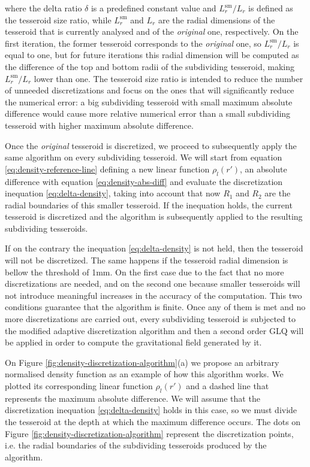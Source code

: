 \documentclass[extra]{gji}
\begin{document}
\noindent where the delta ratio $\delta$ is a predefined constant value and
$L_r^\text{sm}/L_r$ is defined as the tesseroid size ratio, while
$L_r^\text{sm}$ and $L_r$ are the radial dimensions of the tesseroid that is
currently analysed and of the \emph{original} one, respectively.
On the first iteration, the former tesseroid corresponds to the
\emph{original} one, so $L_r^\text{sm}/L_r$ is equal to one, but for
future iterations this radial dimension will be computed as the
difference of the top and bottom radii of the subdividing tesseroid, making
$L_r^\text{sm}/L_r$ lower than one.
The tesseroid size ratio is intended to reduce the number of unneeded
discretizations and focus on the ones that will significantly reduce the
numerical error:
a big subdividing tesseroid with small maximum absolute difference would
cause more relative numerical error than a small subdividing tesseroid with
higher maximum absolute difference.

Once the \emph{original} tesseroid is discretized, we proceed to
subsequently apply the same algorithm on every subdividing tesseroid.
We will start from equation \ref{eq:density-reference-line} defining a
new linear function $\rho_l(r')$, an absolute difference with equation
\ref{eq:density-abs-diff} and evaluate the discretization inequation
\ref{eq:delta-density}, taking into account that now $R_1$ and $R_2$
are the radial boundaries of this smaller tesseroid.
If the inequation holds, the current tesseroid is discretized and the
algorithm is subsequently applied to the resulting subdividing tesseroids.

If on the contrary the inequation \ref{eq:delta-density} is not held,
then the tesseroid will not be discretized.
The same happens if the tesseroid radial dimension is bellow the
threshold of 1mm.
On the first case due to the fact that no more discretizations are
needed, and on the second one because smaller tesseroids will not
introduce meaningful increases in the accuracy of the computation.
This two conditions guarantee that the algorithm is finite.
Once any of them is met and no more discretizations are carried out,
every subdividing tesseroid is subjected to the modified adaptive
discretization algorithm and then a second order GLQ will be applied in
order to compute the gravitational field generated by it.

On Figure \ref{fig:density-discretization-algorithm}(a) we propose an
arbitrary normalised density function as an example of how this
algorithm works.
We plotted its corresponding linear function $\rho_l(r')$ and a
dashed line that represents the maximum absolute difference.
We will assume that the discretization inequation
\ref{eq:delta-density} holds in this case, so we must divide the
tesseroid at the depth at which the maximum difference occurs.
The dots on Figure \ref{fig:density-discretization-algorithm}
represent the discretization points, i.e. the radial boundaries of the
subdividing tesseroids produced by the algorithm.
\end{document}
